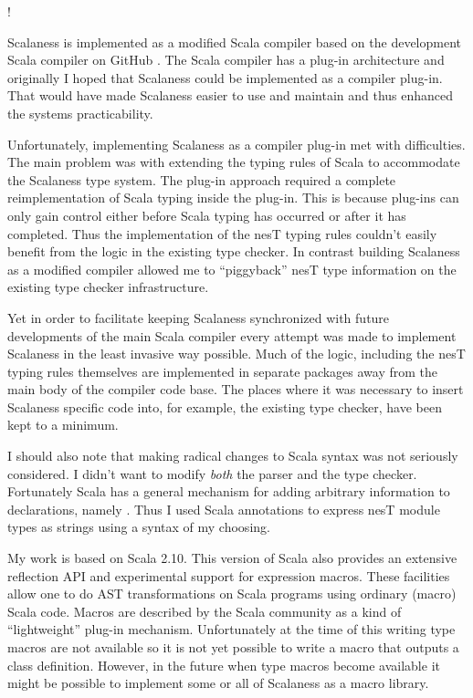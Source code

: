 \lstset{language=scalaness}
\lstMakeShortInline!

Scalaness is implemented as a modified Scala compiler based on the development Scala compiler on
GitHub \cite{scalaness-home}. The Scala compiler has a plug-in architecture and originally I
hoped that Scalaness could be implemented as a compiler plug-in. That would have made Scalaness
easier to use and maintain and thus enhanced the systems practicability.

Unfortunately, implementing Scalaness as a compiler plug-in met with difficulties. The main
problem was with extending the typing rules of Scala to accommodate the Scalaness type system.
The plug-in approach required a complete reimplementation of Scala typing inside the plug-in.
This is because plug-ins can only gain control either before Scala typing has occurred or after
it has completed. Thus the implementation of the nesT typing rules couldn't easily benefit from
the logic in the existing type checker. In contrast building Scalaness as a modified compiler
allowed me to ``piggyback'' nesT type information on the existing type checker infrastructure.

Yet in order to facilitate keeping Scalaness synchronized with future developments of the main
Scala compiler every attempt was made to implement Scalaness in the least invasive way possible.
Much of the logic, including the nesT typing rules themselves are implemented in separate
packages away from the main body of the compiler code base. The places where it was necessary to
insert Scalaness specific code into, for example, the existing type checker, have been kept to a
minimum.

I should also note that making radical changes to Scala syntax was not seriously considered. I
didn't want to modify \emph{both} the parser and the type checker. Fortunately Scala has a
general mechanism for adding arbitrary information to declarations, namely
. Thus I used Scala annotations to express nesT module types as strings
using a syntax of my choosing.

My work is based on Scala 2.10. This version of Scala also provides an extensive reflection API
and experimental support for expression macros. These facilities allow one to do AST
transformations on Scala programs using ordinary (macro) Scala code. Macros are described by the
Scala community as a kind of ``lightweight'' plug-in mechanism. Unfortunately at the time of
this writing type macros are not available so it is not yet possible to write a macro that
outputs a class definition. However, in the future when type macros become available it might be
possible to implement some or all of Scalaness as a macro library.

